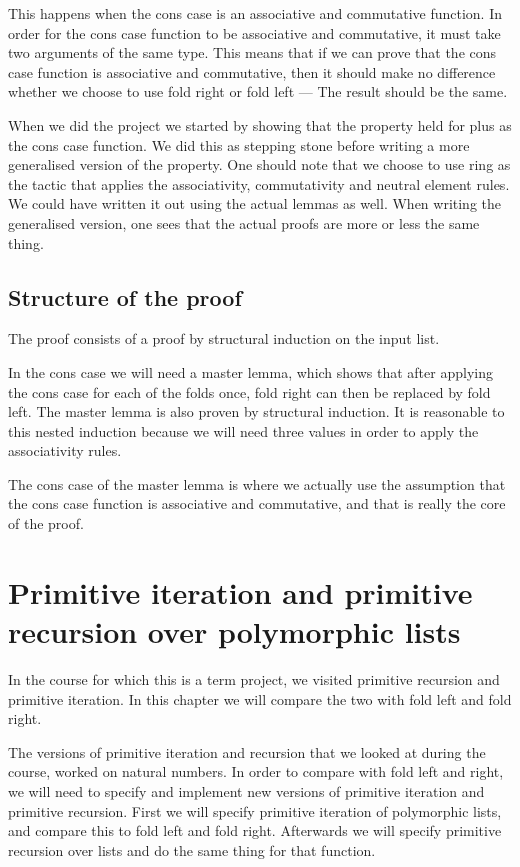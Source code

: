 \documentclass[a4paper]{article}
\begin{document}
This happens when the cons case is an associative and commutative function.  In
order for the cons case function to be associative and commutative, it must take
two arguments of the same type. This means that if we can prove that the cons
case function is associative and commutative, then it should make no difference
whether we choose to use fold right or fold left --- The result should be the
same.

When we did the project we started by showing that the property held for plus as
the cons case function. We did this as stepping stone before writing a more
generalised version of the property. One should note that we choose to use ring
as the tactic that applies the associativity, commutativity and neutral element
rules. We could have written it out using the actual lemmas as well.  When
writing the generalised version, one sees that the actual proofs are more or
less the same thing.

\subsection{Structure of the proof}
The proof consists of a proof by structural induction on the input list.

In the cons case we will need a master lemma, which shows that after applying
the cons case for each of the folds once, fold right can then be replaced by
fold left.  The master lemma is also proven by structural induction. It is
reasonable to this nested induction because we will need three values in order
to apply the associativity rules.

The cons case of the master lemma is where we actually use the assumption that
the cons case function is associative and commutative, and that is really the
core of the proof.

\section{Primitive iteration and primitive recursion over polymorphic lists}
In the course for which this is a term project, we visited primitive recursion
and primitive iteration. In this chapter we will compare the two with fold left
and fold right.

The versions of primitive iteration and recursion that we looked at during the
course, worked on natural numbers. In order to compare with fold left and right,
we will need to specify and implement new versions of primitive iteration and
primitive recursion. First we will specify primitive iteration of polymorphic
lists, and compare this to fold left and fold right. Afterwards we will specify
primitive recursion over lists and do the same thing for that function.
\end{document}
